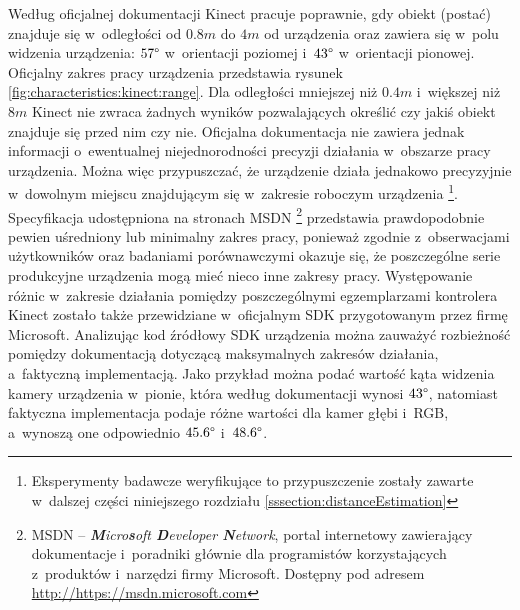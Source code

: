 Według oficjalnej dokumentacji  Kinect pracuje poprawnie, gdy obiekt (postać) znajduje się w~odległości od $0.8m$ do $4m$ od urządzenia oraz zawiera się w~polu widzenia urządzenia: $57\degree$ w~orientacji poziomej i~$43\degree$ w~orientacji pionowej. Oficjalny zakres pracy urządzenia przedstawia rysunek \ref{fig:characteristics:kinect:range}. Dla odległości mniejszej niż $0.4m$ i~większej niż $8m$ Kinect nie zwraca żadnych wyników pozwalających określić czy jakiś obiekt znajduje się przed nim czy nie. Oficjalna dokumentacja nie zawiera jednak informacji o~ewentualnej niejednorodności precyzji działania w~obszarze pracy urządzenia. Można więc przypuszczać, że urządzenie działa jednakowo precyzyjnie w~dowolnym miejscu znajdującym się w~zakresie roboczym urządzenia \footnote{Eksperymenty badawcze weryfikujące to przypuszczenie zostały zawarte w~dalszej części niniejszego rozdziału \ref{sssection:distanceEstimation}}. Specyfikacja udostępniona na stronach MSDN \footnote{MSDN -- \emph{\textbf{M}icro\textbf{s}oft \textbf{D}eveloper \textbf{N}etwork}, portal internetowy zawierający dokumentacje i~poradniki głównie dla programistów korzystających z~produktów i~narzędzi firmy Microsoft. Dostępny pod adresem \url{http://https://msdn.microsoft.com}} przedstawia prawdopodobnie pewien uśredniony lub minimalny zakres pracy, ponieważ zgodnie z~obserwacjami użytkowników  oraz badaniami porównawczymi \cite{DiFilippo2015} okazuje się, że poszczególne serie produkcyjne urządzenia mogą mieć nieco inne zakresy pracy. Występowanie różnic w~zakresie działania pomiędzy poszczególnymi egzemplarzami kontrolera Kinect zostało także przewidziane w~oficjalnym SDK przygotowanym przez firmę Microsoft. Analizując kod źródłowy SDK urządzenia można zauważyć rozbieżność pomiędzy dokumentacją dotyczącą maksymalnych zakresów działania, a~faktyczną implementacją. Jako przykład można podać wartość kąta widzenia kamery urządzenia w~pionie, która według dokumentacji wynosi $43\degree$, natomiast faktyczna implementacja podaje różne wartości dla kamer głębi i~RGB, a~wynoszą one odpowiednio $45.6\degree$ i~$48.6\degree$. 
																															
